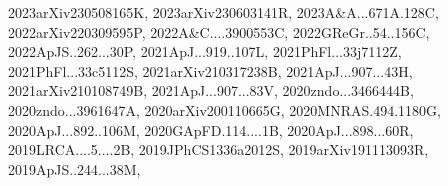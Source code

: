 \documentclass[12pt]{article}
\begin{document}
{2023arXiv230508165K,%
2023arXiv230603141R,%
2023A&A...671A.128C,%
2022arXiv220309595P,%
2022A&C....3900553C,%
2022GReGr..54..156C,%
2022ApJS..262...30P,%
2021ApJ...919..107L,%
2021PhFl...33j7112Z,%
2021PhFl...33c5112S,%
2021arXiv210317238B,%
2021ApJ...907...43H,%
2021arXiv210108749B,%
2021ApJ...907...83V,%
2020zndo...3466444B,%
2020zndo...3961647A,%
2020arXiv200110665G,%
2020MNRAS.494.1180G,%
2020ApJ...892..106M,%
2020GApFD.114....1B,%
2020ApJ...898...60R,%
2019LRCA....5....2B,%
2019JPhCS1336a2012S,%
2019arXiv191113093R,%
2019ApJS..244...38M,%
}
\end{document}
